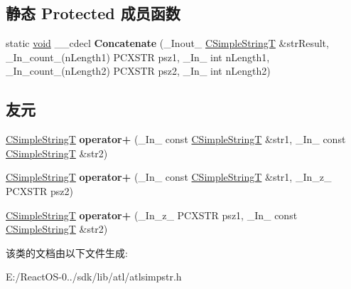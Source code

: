 \subsection*{静态 Protected 成员函数}
\begin{DoxyCompactItemize}
\item 
\mbox{\label{class_a_t_l_1_1_c_simple_string_t_a1504bb70038fd6bf866206c5191bbee2}} 
static \hyperlink{interfacevoid}{void} \+\_\+\+\_\+cdecl {\bfseries Concatenate} (\+\_\+\+Inout\+\_\+ \hyperlink{class_a_t_l_1_1_c_simple_string_t}{C\+Simple\+StringT} \&str\+Result, \+\_\+\+In\+\_\+count\+\_\+(n\+Length1) P\+C\+X\+S\+TR psz1, \+\_\+\+In\+\_\+ int n\+Length1, \+\_\+\+In\+\_\+count\+\_\+(n\+Length2) P\+C\+X\+S\+TR psz2, \+\_\+\+In\+\_\+ int n\+Length2)
\end{DoxyCompactItemize}
\subsection*{友元}
\begin{DoxyCompactItemize}
\item 
\mbox{\label{class_a_t_l_1_1_c_simple_string_t_a61a53fc0f4e79081d697307602e4d68d}} 
\hyperlink{class_a_t_l_1_1_c_simple_string_t}{C\+Simple\+StringT} {\bfseries operator+} (\+\_\+\+In\+\_\+ const \hyperlink{class_a_t_l_1_1_c_simple_string_t}{C\+Simple\+StringT} \&str1, \+\_\+\+In\+\_\+ const \hyperlink{class_a_t_l_1_1_c_simple_string_t}{C\+Simple\+StringT} \&str2)
\item 
\mbox{\label{class_a_t_l_1_1_c_simple_string_t_a187cc43f0bfa5ced7cacb43cd4b73985}} 
\hyperlink{class_a_t_l_1_1_c_simple_string_t}{C\+Simple\+StringT} {\bfseries operator+} (\+\_\+\+In\+\_\+ const \hyperlink{class_a_t_l_1_1_c_simple_string_t}{C\+Simple\+StringT} \&str1, \+\_\+\+In\+\_\+z\+\_\+ P\+C\+X\+S\+TR psz2)
\item 
\mbox{\label{class_a_t_l_1_1_c_simple_string_t_ad5fe10cc934907448d7316bcecc20c57}} 
\hyperlink{class_a_t_l_1_1_c_simple_string_t}{C\+Simple\+StringT} {\bfseries operator+} (\+\_\+\+In\+\_\+z\+\_\+ P\+C\+X\+S\+TR psz1, \+\_\+\+In\+\_\+ const \hyperlink{class_a_t_l_1_1_c_simple_string_t}{C\+Simple\+StringT} \&str2)
\end{DoxyCompactItemize}


该类的文档由以下文件生成\+:\begin{DoxyCompactItemize}
\item 
E\+:/\+React\+O\+S-\/0../sdk/lib/atl/atlsimpstr.\+h\end{DoxyCompactItemize}
